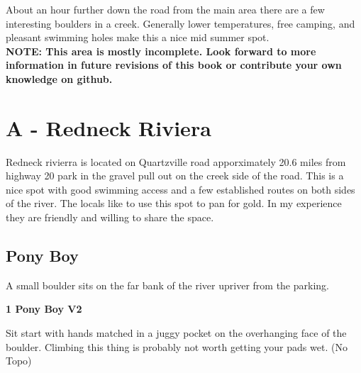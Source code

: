







\raggedcolumns
\begin{multicols}{2}

\end{multicols}
\begin{multicols}{2}
About an hour further down the road from the main area there are a few interesting boulders in a creek. Generally lower temperatures, free camping, and pleasant swimming holes make this a nice mid summer spot.\\

\textbf{NOTE: This area is mostly incomplete. Look forward to more information in future revisions of this book or contribute your own knowledge on github.}\\


\newpage


		\section{A - Redneck Riviera}\label{sa:Redneck Riviera}
	Redneck rivierra is located on Quartzville road apporximately 20.6 miles from highway 20 park in the gravel pull out on the creek side of the road. This is a nice spot with good swimming access and a few established routes on both sides of the river. The locals like to use this spot to pan for gold. In my experience they are friendly and willing to share the space.\\

	
	
		
		\needspace{1.5cm}
		\subsection*{Pony Boy}\label{bf:Pony Boy}
		A small boulder sits on the far bank of the river upriver from the parking.\\
	
		
			
			\needspace{1.5cm}
\label{rt:Pony Boy}
\colorbox{green!20}{
\parbox{0.95\linewidth}{
\textbf{
1 Pony Boy V2  
}}}

			\begin{adjustwidth}{0.5cm}{}			
			Sit start with hands matched in a juggy pocket on the overhanging face of the boulder. Climbing this thing is probably not worth getting your pads wet. (No Topo)
			\end{adjustwidth}
			

\end{multicols}
